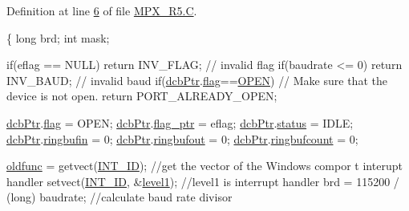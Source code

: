 Definition at line \hyperlink{_m_p_x___r5_8_c_source_l00006}{6} of file \hyperlink{_m_p_x___r5_8_c_source}{MPX\_\-R5.C}.




\begin{DoxyCode}
                                               \{
                \textcolor{keywordtype}{long} brd;
                \textcolor{keywordtype}{int} mask;

                \textcolor{keywordflow}{if}(eflag == NULL)
                        \textcolor{keywordflow}{return} INV\_FLAG; \textcolor{comment}{// invalid flag}
                \textcolor{keywordflow}{if}(baudrate <= 0)
                        \textcolor{keywordflow}{return} INV\_BAUD;  \textcolor{comment}{// invalid baud}
                \textcolor{keywordflow}{if}(\hyperlink{_m_p_x___r5_8h_acf6724d515070007ff4ac39c32640311}{dcbPtr}.\hyperlink{structdevice_ac2d4a1d39c1a5a858d88f2482d6900c8}{flag}==\hyperlink{_m_p_x___r5_8h_a1354b70ac6803a06beebe84f61b5f95b}{OPEN}) \textcolor{comment}{// Make sure that the device is not open.}
                        \textcolor{keywordflow}{return} PORT\_ALREADY\_OPEN;

                \hyperlink{_m_p_x___r5_8h_acf6724d515070007ff4ac39c32640311}{dcbPtr}.\hyperlink{structdevice_ac2d4a1d39c1a5a858d88f2482d6900c8}{flag} = OPEN;
                \hyperlink{_m_p_x___r5_8h_acf6724d515070007ff4ac39c32640311}{dcbPtr}.\hyperlink{structdevice_aa14e67b7bd4e2bc5751268f0be91983f}{flag_ptr} = eflag;
                \hyperlink{_m_p_x___r5_8h_acf6724d515070007ff4ac39c32640311}{dcbPtr}.\hyperlink{structdevice_aaaefcdae0117d89bef5340a1e3f432e1}{status} = IDLE; 
                \hyperlink{_m_p_x___r5_8h_acf6724d515070007ff4ac39c32640311}{dcbPtr}.\hyperlink{structdevice_a87b6f10cd47f45a38cfa264c298acc04}{ringbufin} = 0; 
                \hyperlink{_m_p_x___r5_8h_acf6724d515070007ff4ac39c32640311}{dcbPtr}.\hyperlink{structdevice_ac5f863bd4d89e6182fb4c517d93afb8e}{ringbufout} = 0; 
                \hyperlink{_m_p_x___r5_8h_acf6724d515070007ff4ac39c32640311}{dcbPtr}.\hyperlink{structdevice_ad06a8146a22a605c0f463b212774cc92}{ringbufcount} = 0;
          
                \hyperlink{_m_p_x___r5_8h_aecebfaddee878c55ece8a1aa8ac843d4}{oldfunc} = getvect(\hyperlink{_m_p_x___r5_8h_a57912ff27e6b123b86821203a0338760}{INT_ID}); \textcolor{comment}{//get the vector of the Windows compor
      t interupt handler  }
                setvect(\hyperlink{_m_p_x___r5_8h_a57912ff27e6b123b86821203a0338760}{INT_ID}, &\hyperlink{_m_p_x___r5_8_c_a49235bff2654267b70d5656543f2ba81}{level1}); \textcolor{comment}{//level1 is interrupt handler      }
                brd = 115200 / (long) baudrate; \textcolor{comment}{//calculate baud rate divisor}
         

\end{DoxyCode}
